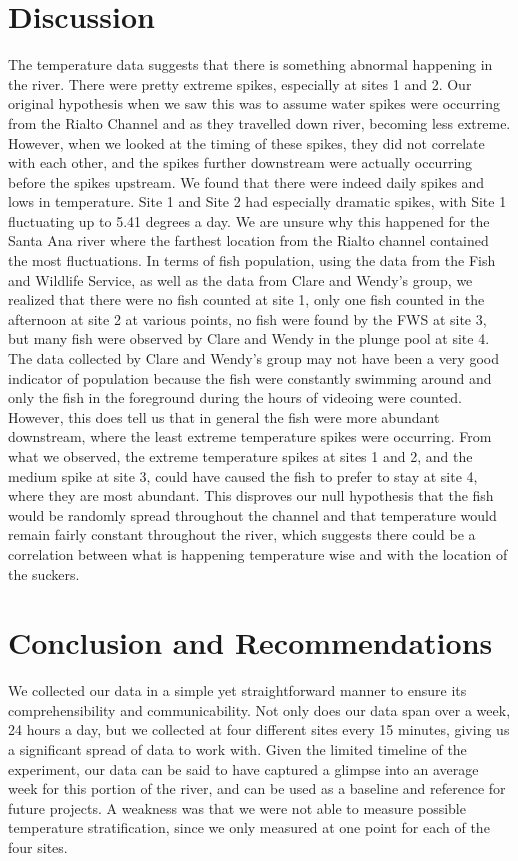 \documentclass{article}\usepackage[]{graphicx}\usepackage[]{color}
\begin{document}
\section{Discussion}

The temperature data suggests that there is something abnormal happening in the river. There were pretty extreme spikes, especially at sites 1 and 2. Our original hypothesis when we saw this was to assume water spikes were occurring from the Rialto Channel and as they travelled down river, becoming less extreme. However, when we looked at the timing of these spikes, they did not correlate with each other, and the spikes further downstream were actually occurring before the spikes upstream. We found that there were indeed daily spikes and lows in temperature. Site 1 and Site 2 had especially dramatic spikes, with Site 1 fluctuating up to 5.41 degrees a day. We are unsure why this happened for the Santa Ana river where the farthest location from the Rialto channel contained the most fluctuations. In terms of fish population, using the data from the Fish and Wildlife Service, as well as the data from Clare and Wendy's group, we realized that there were no fish counted at site 1, only one fish counted in the afternoon at site 2 at various points, no fish were found by the FWS at site 3, but many fish were observed by Clare and Wendy in the plunge pool at site 4. The data collected by Clare and Wendy’s group may not have been a very good indicator of population because the fish were constantly swimming around and only the fish in the foreground during the hours of videoing were counted. However, this does tell us that in general the fish were more abundant downstream, where the least extreme temperature spikes were occurring. From what we observed, the extreme temperature spikes at sites 1 and 2, and the medium spike at site 3, could have caused the fish to prefer to stay at site 4, where they are most abundant. This disproves our null hypothesis that the fish would be randomly spread throughout the channel and that temperature would remain fairly constant throughout the river, which suggests there could be a correlation between what is happening temperature wise and with the location of the suckers.

\section{Conclusion and Recommendations}

We collected our data in a simple yet straightforward manner to ensure its comprehensibility and communicability. Not only does our data span over a week, 24 hours a day, but we collected at four different sites every 15 minutes, giving us a significant spread of data to work with. Given the limited timeline of the experiment, our data can be said to have captured a glimpse into an average week for this portion of the river, and can be used as a baseline and reference for future projects. A weakness was that we were not able to measure possible temperature stratification, since we only measured at one point for each of the four sites. 
\end{document}
